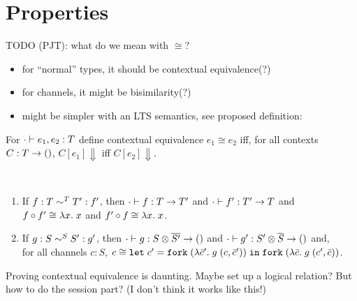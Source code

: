 
\section{Properties}
\label{sec:properties}

TODO (PJT): what do we mean with $\cong$?
\begin{itemize}
\item for ``normal'' types, it should be contextual equivalence(?)
\item for channels, it might be bisimilarity(?)
\item might be simpler with an LTS semantics, see proposed definition:
\end{itemize}

\begin{definition}
  For $\typing[\CNil]{e_1, e_2} T$ define contextual equivalence $e_1 \cong e_2$
  iff, for all contexts $C : T \to \TUnit$, $C[e_1] \Downarrow$ iff $C[e_2] \Downarrow$. 
\end{definition}

\begin{lemma}[Conversions]~\\[-\baselineskip]
  \begin{enumerate}
  \item If $f : T \eqt T' : f'$,
  then $\typing[\CNil]{f}{\TFun T{T'}}$
  and  $\typing[\CNil]{f'}{\TFun {T'}T}$
  and  $f \circ f' \cong \ELam x x$
  and  $f' \circ f \cong \ELam x x$.
\item If $g : S \eqs S' : g'$,
  then $\typing[\CNil]{g}{\TFun {\TPair {S} {\TDual{S'}}} \TUnit}$
  and $\typing[\CNil]{g'}{\TFun {\TPair {S'} {\TDual{S}}} \TUnit}$
  and,\\
  for all channels $c : S$,  $c \cong \ELet{c'}{\EFork{( \ELam {\bar c'} g \; (c, \bar c')) }}{\EFork{( \ELam {\bar c} g \; (c', \bar c)) }} $. 
\end{enumerate}
\end{lemma}

Proving contextual equivalence is daunting. Maybe set up a logical relation? But how to do the session part?
(I don't think it works like this!)

